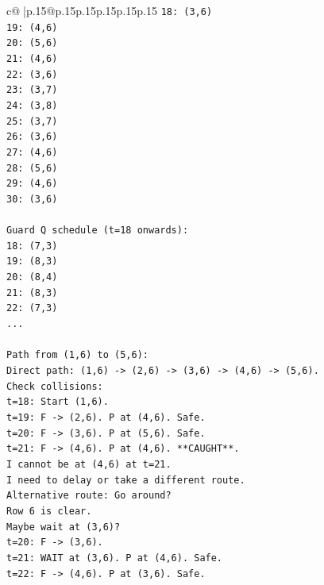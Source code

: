 \documentclass{article}
\begin{document}
{\begin{supertabular}{c@{$\;$}|p{.15\linewidth}@{}p{.15\linewidth}p{.15\linewidth}p{.15\linewidth}p{.15\linewidth}p{.15\linewidth}}
{{{\texttt{18: (3,6)} \\
\texttt{19: (4,6)} \\
\texttt{20: (5,6)} \\
\texttt{21: (4,6)} \\
\texttt{22: (3,6)} \\
\texttt{23: (3,7)} \\
\texttt{24: (3,8)} \\
\texttt{25: (3,7)} \\
\texttt{26: (3,6)} \\
\texttt{27: (4,6)} \\
\texttt{28: (5,6)} \\
\texttt{29: (4,6)} \\
\texttt{30: (3,6)} \\
\\ 
\texttt{Guard Q schedule (t=18 onwards):} \\
\texttt{18: (7,3)} \\
\texttt{19: (8,3)} \\
\texttt{20: (8,4)} \\
\texttt{21: (8,3)} \\
\texttt{22: (7,3)} \\
\texttt{...} \\
\\ 
\texttt{Path from (1,6) to (5,6):} \\
\texttt{Direct path: (1,6) {-}> (2,6) {-}> (3,6) {-}> (4,6) {-}> (5,6).} \\
\texttt{Check collisions:} \\
\texttt{t=18: Start (1,6).} \\
\texttt{t=19: F {-}> (2,6). P at (4,6). Safe.} \\
\texttt{t=20: F {-}> (3,6). P at (5,6). Safe.} \\
\texttt{t=21: F {-}> (4,6). P at (4,6). **CAUGHT**.} \\
\texttt{I cannot be at (4,6) at t=21.} \\
\texttt{I need to delay or take a different route.} \\
\texttt{Alternative route: Go around?} \\
\texttt{Row 6 is clear.} \\
\texttt{Maybe wait at (3,6)?} \\
\texttt{t=20: F {-}> (3,6).} \\
\texttt{t=21: WAIT at (3,6). P at (4,6). Safe.} \\
\texttt{t=22: F {-}> (4,6). P at (3,6). Safe.} \\
}}}
\end{supertabular}}
\end{document}
